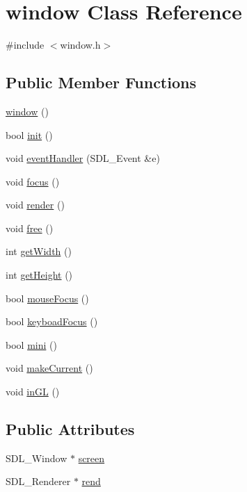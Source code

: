 \hypertarget{classwindow}{}\section{window Class Reference}
\label{classwindow}


{\ttfamily \#include $<$window.\+h$>$}

\subsection*{Public Member Functions}
\begin{DoxyCompactItemize}
\item 
\hyperlink{classwindow_a8431910ea51a5a16ca22f05cb3cd9700}{window} ()
\item 
bool \hyperlink{classwindow_ae08987fb6d4aa85ef942118cee29db3c}{init} ()
\item 
void \hyperlink{classwindow_afcc347d564261d5c8177cfa843446193}{event\+Handler} (S\+D\+L\+\_\+\+Event \&e)
\item 
void \hyperlink{classwindow_a065b185e267a3781db38da247a1f111e}{focus} ()
\item 
void \hyperlink{classwindow_a0f16fe01af181d9a953bf8cf8f09ec9b}{render} ()
\item 
void \hyperlink{classwindow_a6714e131fbe565a24caf770947ad3411}{free} ()
\item 
int \hyperlink{classwindow_a5559b157ba1490b30a8f378ad93ea6c5}{get\+Width} ()
\item 
int \hyperlink{classwindow_a3c0dbe119eb9fee0bc0dee6e6e11e11d}{get\+Height} ()
\item 
bool \hyperlink{classwindow_a075faf88a621288e18a9c112628be059}{mouse\+Focus} ()
\item 
bool \hyperlink{classwindow_af1fea6fcd133b4dc5a9f8ce5badfa3c5}{keyboad\+Focus} ()
\item 
bool \hyperlink{classwindow_aaedffb8fcfdda61beda75a2f31651948}{mini} ()
\item 
void \hyperlink{classwindow_a0b20618eaa80cec156c41e65e5d92817}{make\+Current} ()
\item 
void \hyperlink{classwindow_a06c98cfaea6fffa00d23c3253a8a8cfc}{in\+GL} ()
\end{DoxyCompactItemize}
\subsection*{Public Attributes}
\begin{DoxyCompactItemize}
\item 
S\+D\+L\+\_\+\+Window $\ast$ \hyperlink{classwindow_acc676834f8692a998b7346bdd1264ba2}{screen}
\item 
S\+D\+L\+\_\+\+Renderer $\ast$ \hyperlink{classwindow_a1a6f43018b2e8d43531012fd854f74e1}{rend}
\end{DoxyCompactItemize}


